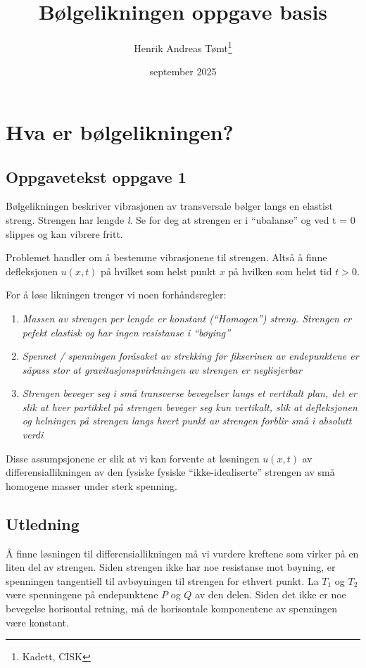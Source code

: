 \documentclass[12pt, a4paper, leqno]{article}
\title{Bølgelikningen oppgave basis}
\author{Henrik Andreas Tømt\thanks{Kadett, CISK}}
\date{september 2025}
\begin{document}
\maketitle

\tableofcontents

\section{Hva er bølgelikningen?}

\subsection{Oppgavetekst oppgave 1}

Bølgelikningen beskriver vibrasjonen av transversale bølger langs en elastist streng.
Strengen har lengde \textit{l}. Se for deg at strengen er i ``ubalanse'' og ved t = 0
slippes og kan vibrere fritt. 

Problemet handler om å bestemme vibrasjonene til strengen. Altså å finne defleksjonen $u(x, t)$ 
på hvilket som helst punkt $x$ på hvilken som helst tid $t > 0$.

For å løse likningen trenger vi noen forhåndsregler: 
\begin{enumerate}
  \item \textit{Massen av strengen per lengde er konstant (``Homogen'') streng. Strengen er pefekt
    elastisk og har ingen resistanse i ``bøying''}
  \item \textit{Spennet / spenningen foråsaket av strekking før fikserinen av endepunktene er såpass
    stor at gravitasjonspvirkningen av strengen er neglisjerbar}
  \item \textit{Strengen beveger seg i små transverse bevegelser langs et vertikalt plan, det er slik
    at hver partikkel på strengen beveger seg kun vertikalt, slik at defleksjonen og helningen på strengen
    langs hvert punkt av strengen forblir små i absolutt verdi}
\end{enumerate}

Disse assumpsjonene er slik at vi kan forvente at løsningen $u(x , t)$ av differensiallikningen av den fysiske 
fysiske ``ikke-idealiserte'' strengen av små homogene masser under sterk spenning. 
\subsection{Utledning}

Å finne løsningen til differensiallikningen må vi vurdere kreftene som virker på en liten del av strengen. 
Siden strengen ikke har noe resistanse mot bøyning, er spenningen tangentiell til avbøyningen til strengen 
for ethvert punkt. La $T_1$ og $T_2$ være spenningene på endepunktene $P$ og $Q$ av den delen. Siden det ikke 
er noe bevegelse horisontal retning, må de horisontale komponentene av spenningen være konstant.
\end{document}
